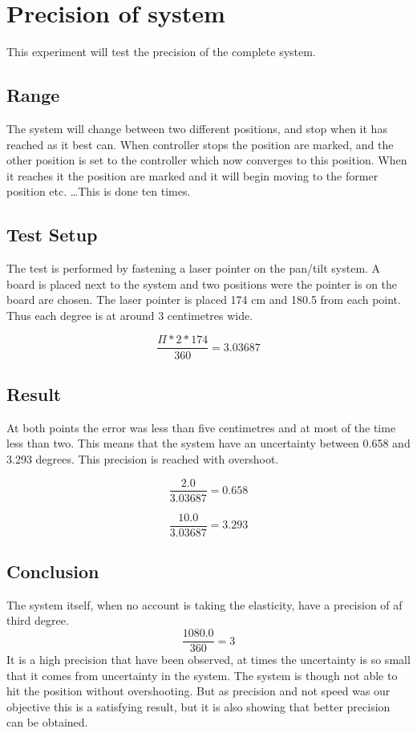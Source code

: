 \section{Precision of system}

This experiment will test the precision of the complete system. 

\subsection{Range}

The system will change between two different positions, and stop when it has reached as it best can. When controller stops the position are marked, and the other position is set to the controller which now converges to this position. When it reaches it the position are marked and it will begin moving to the former position etc. \dots This is done ten times.

\subsection{Test Setup}

The test is performed by fastening a laser pointer on the pan/tilt system. A board is placed next to the system and two positions were the pointer is on the board are chosen. The laser pointer is placed 174 cm and 180.5 from each point. Thus each degree is at around 3 centimetres wide.

\[ \frac{\Pi*2*174}{360} = 3.03687 \]


\subsection{Result}

At both points the error was less than five centimetres and at most of the time less than two. This means that the system have an uncertainty between 0.658 and 3.293 degrees. This precision is reached with overshoot.

\[ \frac{2.0}{3.03687} = 0.658 \]

\[ \frac{10.0}{3.03687} = 3.293 \]

\subsection{Conclusion}

The system itself, when no account is taking the elasticity, have a precision of af third degree.
\[ \frac{1080.0}{360} = 3 \]
It is a high precision that have been observed, at times the uncertainty is so small that it comes from uncertainty in the system. The system is though not able to hit the position without overshooting. But as precision and not speed was our objective this is a satisfying result, but it is also showing that better precision can be obtained.
